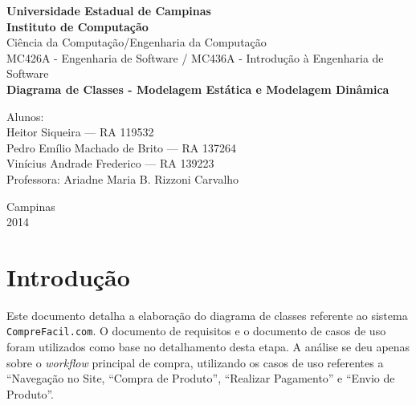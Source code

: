 \documentclass[12pt,a4paper]{article}
\begin{document}

\begin{titlepage}
\begin{center}
{\huge \textbf{Universidade Estadual de Campinas}}\\[0.2cm]
{\huge \textbf{Instituto de Computação}}\\[0.2cm]
{\large Ciência da Computação/Engenharia da Computação}\\[0.2cm]
{\large MC426A - Engenharia de Software / MC436A - Introdução à Engenharia de Software}\\[5.1cm]
{\bf \huge Diagrama de Classes - Modelagem Estática e Modelagem Dinâmica}\\[5.1cm]
\end{center}
{\large Alunos:\\
Heitor Siqueira --- RA 119532\\
Pedro Emílio Machado de Brito --- RA 137264\\
Vinícius Andrade Frederico --- RA 139223}\\[0.7cm]
{\large Professora: Ariadne Maria B. Rizzoni Carvalho}\\[1.5cm]
\begin{center}
{\large Campinas}\\[0.2cm]
{\large 2014}
\end{center}
\end{titlepage}


\tableofcontents
\afterpage{\cfoot{\thepage}}

\newpage

\section{Introdução}
Este documento detalha a elaboração do diagrama de classes referente ao sistema \verb|CompreFacil.com|.
O documento de requisitos e o documento de casos de uso foram utilizados como base no detalhamento desta etapa.
A análise se deu apenas sobre o \textit{workflow} principal de compra, utilizando os casos de uso referentes a ``Navegação no Site, ``Compra de Produto'', ``Realizar Pagamento'' e ``Envio de Produto''.
\end{document}
